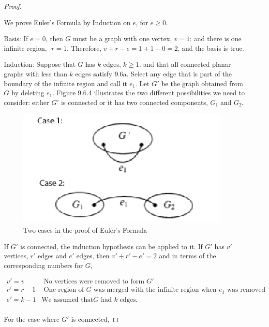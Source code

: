\documentclass[10pt,]{book}
\theoremstyle{plain}
\theoremstyle{definition}
\theoremstyle{definition}
\theoremstyle{definition}
\theoremstyle{definition}
\theoremstyle{definition}
\numberwithin{equation}{section}
\begin{document}
\begin{proof}\hypertarget{proof-5}{}
We prove Euler's Formula by Induction on \(e\), for \(e \geq  0\).%
\par
Basis: If \(e = 0\), then \(G\) must be a graph with one vertex, \(v = 1\); and there is one infinite region,\(\text{  }r = 1\). Therefore, \(v + r-e= 1 + 1-0 = 2\), and the basis is true.%
\par
Induction: Suppose that \(G\) has \(k\) edges, \(k \geq  1\), and that all connected planar graphs with less than \(k\) edges satisfy
9.6a. Select any edge that is part of the boundary of the infinite region and call it \(e_1\). Let \(G'\) be the graph obtained from \(G\)
by deleting \(e_1\). Figure 9.6.4 illustrates the two different possibilities we need to consider: either \(G'\) is connected or it has two
connected components, \(G_1\) and \(G_2\).%
\leavevmode%
\begin{figure}
\centering
\includegraphics[width=1\linewidth]{images/fig-euler-proof-scheme.png}
\caption{Two cases in the proof of Euler's Formula
                \label{fig-euler-proof-scheme}}
\end{figure}
\par
If \(G'\) is connected, the induction hypothesis can be applied to it. If \(G'\) has \(v'\) vertices, \(r'\) edges and \(e'\) edges, then \(v'+r'-e'=2\) and in terms of the corresponding numbers for \(G\), 

   \[\begin{array}{ll}
 v'=v & \textrm{ No vertices were removed to form } G' \\
 r'=r-1 & \textrm{ One region of } G \textrm{ was merged with the infinite region when } e_1 \textrm{ was removed}
\\
 e' = k-1 & \textrm{We assumed that} G \textrm{ had } k \textrm{ edges.} \\
\end{array}\]%
\par
For the case where \(G'\) is connected, 


\end{proof}
\end{document}
